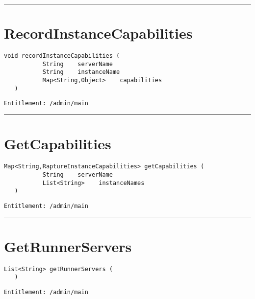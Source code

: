 \rule{12cm}{2pt}
\section{RecordInstanceCapabilities}
\label{Api:RecordInstanceCapabilities}
\begin{lstlisting}[style=nonumbers]
   void recordInstanceCapabilities (
           String    serverName
           String    instanceName
           Map<String,Object>    capabilities
   )
\end{lstlisting}
\begin{Verbatim}[formatcom=\color{Maroon}]
  Entitlement: /admin/main
\end{Verbatim}



\rule{12cm}{2pt}
\section{GetCapabilities}
\label{Api:GetCapabilities}
\begin{lstlisting}[style=nonumbers]
   Map<String,RaptureInstanceCapabilities> getCapabilities (
           String    serverName
           List<String>    instanceNames
   )
\end{lstlisting}
\begin{Verbatim}[formatcom=\color{Maroon}]
  Entitlement: /admin/main
\end{Verbatim}



\rule{12cm}{2pt}
\section{GetRunnerServers}
\label{Api:GetRunnerServers}
\begin{lstlisting}[style=nonumbers]
   List<String> getRunnerServers (
   )
\end{lstlisting}
\begin{Verbatim}[formatcom=\color{Maroon}]
  Entitlement: /admin/main
\end{Verbatim}




